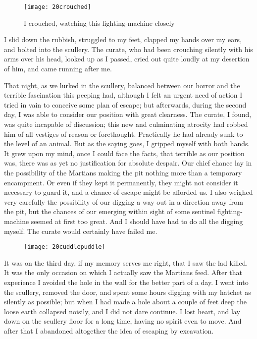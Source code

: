 \begin{figure}[tbph]
\centering
\texttt{[image: 20crouched]}
\caption{I crouched, watching this fighting-machine closely}
\end{figure}

I slid down the rubbish, struggled to my feet, clapped my hands over my ears, and bolted into the scullery. The curate, who had been crouching silently with his arms over his head, looked up as I passed, cried out quite loudly at my desertion of him, and came running after me.

That night, as we lurked in the scullery, balanced between our horror and the terrible fascination this peeping had, although I felt an urgent need of action I tried in vain to conceive some plan of escape; but afterwards, during the second day, I was able to consider our position with great clearness. The curate, I found, was quite incapable of discussion; this new and culminating atrocity had robbed him of all vestiges of reason or forethought. Practically he had already sunk to the level of an animal. But as the saying goes, I gripped myself with both hands. It grew upon my mind, once I could face the facts, that terrible as our position was, there was as yet no justification for absolute despair. Our chief chance lay in the possibility of the Martians making the pit nothing more than a temporary encampment. Or even if they kept it permanently, they might not consider it necessary to guard it, and a chance of escape might be afforded us. I also weighed very carefully the possibility of our digging a way out in a direction away from the pit, but the chances of our emerging within sight of some sentinel fighting-machine seemed at first too great. And I should have had to do all the digging myself. The curate would certainly have failed me.

\begin{figure}[tb]
\centering
\texttt{[image: 20cuddlepuddle]}
\end{figure}

It was on the third day, if my memory serves me right, that I saw the lad killed. It was the only occasion on which I actually saw the Martians feed. After that experience I avoided the hole in the wall for the better part of a day. I went into the scullery, removed the door, and spent some hours digging with my hatchet as silently as possible; but when I had made a hole about a couple of feet deep the loose earth collapsed noisily, and I did not dare continue. I lost heart, and lay down on the scullery floor for a long time, having no spirit even to move. And after that I abandoned altogether the idea of escaping by excavation.

